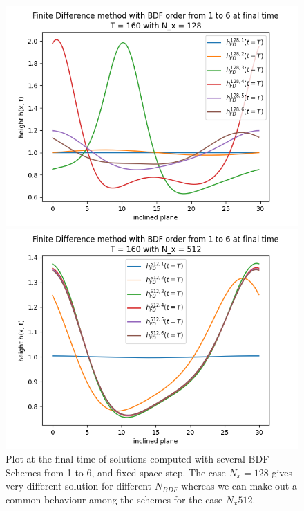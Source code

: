 \documentclass[12pt]{article}
\begin{document}
\begin{figure}[htbp]
    \centering
    \begin{minipage}[b]{0.45\textwidth}
        \centering
        \includegraphics[width=\textwidth]{Verif_scheme/plot_FD_BDF_Nx_128.png}
        \caption{$N_x = 128$}
        \label{fig:image1}
    \end{minipage}
    \hfill
    \begin{minipage}[b]{0.45\textwidth}
        \centering
        \includegraphics[width=\textwidth]{Verif_scheme/plot_FD_BDF_Nx_512.png}
        \caption{$N_x=512$}
        \label{fig:image2}
    \end{minipage}
    \caption{Plot at the final time of solutions computed with  several BDF Schemes from 1 to 6, and fixed space step. The case $N_x=128$ gives very different solution for different $N_{BDF}$ whereas we can make out a common behaviour among the schemes for the case $N_x512.$  }
    \label{fig:BDF_plot_128_512}
\end{figure}
\end{document}
